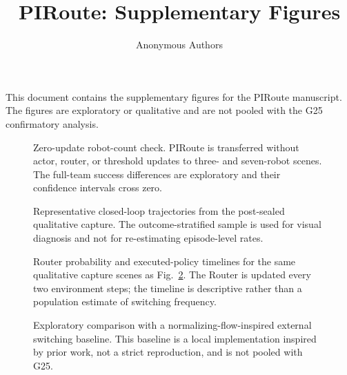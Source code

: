 \documentclass[letterpaper,10pt,conference]{ieeeconf}
\title{PIRoute: Supplementary Figures}
\author{Anonymous Authors}
\begin{document}
\maketitle
\thispagestyle{empty}
\pagestyle{empty}

This document contains the supplementary figures for the PIRoute manuscript.
The figures are exploratory or qualitative and are not pooled with the G25
confirmatory analysis.

\begin{figure}[t]
  \centering
  
  \caption{Zero-update robot-count check. PIRoute is transferred without actor,
  router, or threshold updates to three- and seven-robot scenes. The full-team
  success differences are exploratory and their confidence intervals cross zero.}
  \label{fig:s1}
\end{figure}

\begin{figure}[t]
  \centering
  
  \caption{Representative closed-loop trajectories from the post-sealed
  qualitative capture. The outcome-stratified sample is used for visual
  diagnosis and not for re-estimating episode-level rates.}
  \label{fig:s2}
\end{figure}

\begin{figure}[t]
  \centering
  
  \caption{Router probability and executed-policy timelines for the same
  qualitative capture scenes as Fig.~\ref{fig:s2}. The Router is updated every
  two environment steps; the timeline is descriptive rather than a population
  estimate of switching frequency.}
  \label{fig:s3}
\end{figure}

\begin{figure}[t]
  \centering
  
  \caption{Exploratory comparison with a normalizing-flow-inspired external
  switching baseline. This baseline is a local implementation inspired by prior
  work, not a strict reproduction, and is not pooled with G25.}
  \label{fig:s4}
\end{figure}
\end{document}
